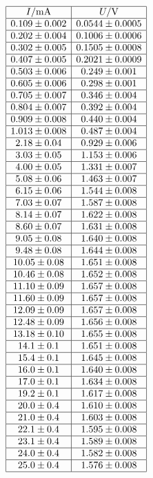 \documentclass[a4paper,12pt]{article}
\begin{document}
\begin{table}
$$
\begin{array}{|c|c|}
\hline
I/\mbox{mA}& U/\mbox{V} \\ \hline
0.109\pm 0.002&0.0544\pm 0.0005\\ \hline
0.202\pm 0.004&0.1006\pm 0.0006\\ \hline
0.302\pm 0.005&0.1505\pm 0.0008\\ \hline
0.407\pm 0.005&0.2021\pm 0.0009\\ \hline
0.503\pm 0.006&0.249\pm 0.001\\ \hline
0.605\pm 0.006&0.298\pm 0.001\\ \hline
0.705\pm 0.007&0.346\pm 0.004\\ \hline
0.804\pm 0.007&0.392\pm 0.004\\ \hline
0.909\pm 0.008&0.440\pm 0.004\\ \hline
1.013\pm 0.008&0.487\pm 0.004\\ \hline
2.18\pm 0.04&0.929\pm 0.006\\ \hline
3.03\pm 0.05&1.153\pm 0.006\\ \hline
4.00\pm 0.05&1.331\pm 0.007\\ \hline
5.08\pm 0.06&1.463\pm 0.007\\ \hline
6.15\pm 0.06&1.544\pm 0.008\\ \hline
7.03\pm 0.07&1.587\pm 0.008\\ \hline
8.14\pm 0.07&1.622\pm 0.008\\ \hline
8.60\pm 0.07&1.631\pm 0.008\\ \hline
9.05\pm 0.08&1.640\pm 0.008\\ \hline
9.48\pm 0.08&1.644\pm 0.008\\ \hline
10.05\pm 0.08&1.651\pm 0.008\\ \hline
10.46\pm 0.08&1.652\pm 0.008\\ \hline
11.10\pm 0.09&1.657\pm 0.008\\ \hline
11.60\pm 0.09&1.657\pm 0.008\\ \hline
12.09\pm 0.09&1.657\pm 0.008\\ \hline
12.48\pm 0.09&1.656\pm 0.008\\ \hline
13.18\pm 0.10&1.655\pm 0.008\\ \hline
14.1\pm 0.1&1.651\pm 0.008\\ \hline
15.4\pm 0.1&1.645\pm 0.008\\ \hline
16.0\pm 0.1&1.640\pm 0.008\\ \hline
17.0\pm 0.1&1.634\pm 0.008\\ \hline
19.2\pm 0.1&1.617\pm 0.008\\ \hline
20.0\pm 0.4&1.610\pm 0.008\\ \hline
21.0\pm 0.4&1.603\pm 0.008\\ \hline
22.1\pm 0.4&1.595\pm 0.008\\ \hline
23.1\pm 0.4&1.589\pm 0.008\\ \hline
24.0\pm 0.4&1.582\pm 0.008\\ \hline
25.0\pm 0.4&1.576\pm 0.008\\ \hline
\end{array}
$$
\caption{Tabulka VA charakteristiky termočlánku}
\label{TVA}
\end{table}
\end{document}

